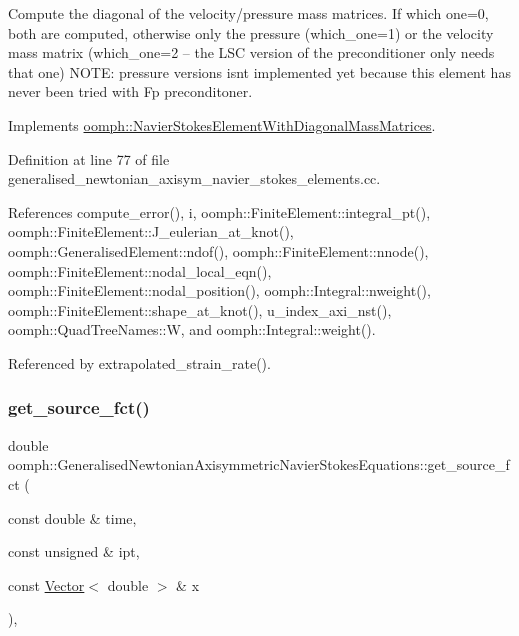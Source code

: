 Compute the diagonal of the velocity/pressure mass matrices. If which one=0, both are computed, otherwise only the pressure (which\+\_\+one=1) or the velocity mass matrix (which\+\_\+one=2 -- the L\+SC version of the preconditioner only needs that one) N\+O\+TE\+: pressure versions isn\textquotesingle{}t implemented yet because this element has never been tried with Fp preconditoner. 

Implements \hyperlink{classoomph_1_1NavierStokesElementWithDiagonalMassMatrices_a4d491d10823eee10381a9b14bce6c244}{oomph\+::\+Navier\+Stokes\+Element\+With\+Diagonal\+Mass\+Matrices}.



Definition at line 77 of file generalised\+\_\+newtonian\+\_\+axisym\+\_\+navier\+\_\+stokes\+\_\+elements.\+cc.



References compute\+\_\+error(), i, oomph\+::\+Finite\+Element\+::integral\+\_\+pt(), oomph\+::\+Finite\+Element\+::\+J\+\_\+eulerian\+\_\+at\+\_\+knot(), oomph\+::\+Generalised\+Element\+::ndof(), oomph\+::\+Finite\+Element\+::nnode(), oomph\+::\+Finite\+Element\+::nodal\+\_\+local\+\_\+eqn(), oomph\+::\+Finite\+Element\+::nodal\+\_\+position(), oomph\+::\+Integral\+::nweight(), oomph\+::\+Finite\+Element\+::shape\+\_\+at\+\_\+knot(), u\+\_\+index\+\_\+axi\+\_\+nst(), oomph\+::\+Quad\+Tree\+Names\+::W, and oomph\+::\+Integral\+::weight().



Referenced by extrapolated\+\_\+strain\+\_\+rate().

\mbox{\label{classoomph_1_1GeneralisedNewtonianAxisymmetricNavierStokesEquations_a8db87dc65690887c81940410b2701ed9}} 
\subsubsection{\texorpdfstring{get\+\_\+source\+\_\+fct()}{get\_source\_fct()}}
{\footnotesize\ttfamily double oomph\+::\+Generalised\+Newtonian\+Axisymmetric\+Navier\+Stokes\+Equations\+::get\+\_\+source\+\_\+fct (\begin{DoxyParamCaption}\item[{const double \&}]{time,  }\item[{const unsigned \&}]{ipt,  }\item[{const \hyperlink{classoomph_1_1Vector}{Vector}$<$ double $>$ \&}]{x }\end{DoxyParamCaption})\hspace{0.3cm}{\ttfamily [inline]}, {\ttfamily [protected]}}



